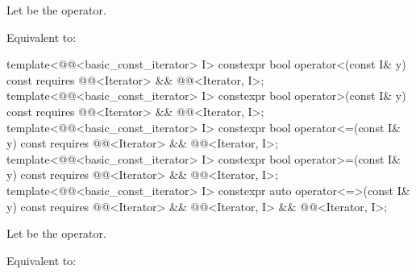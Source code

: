 \begin{itemdescr}
\pnum
Let  be the operator.

\pnum
\effects
Equivalent to:
\end{itemdescr}

%
%
%
%
%
\begin{itemdecl}
template<@@<basic_const_iterator> I>
  constexpr bool operator<(const I& y) const
    requires @@<Iterator> && @@<Iterator, I>;
template<@@<basic_const_iterator> I>
  constexpr bool operator>(const I& y) const
    requires @@<Iterator> && @@<Iterator, I>;
template<@@<basic_const_iterator> I>
  constexpr bool operator<=(const I& y) const
    requires @@<Iterator> && @@<Iterator, I>;
template<@@<basic_const_iterator> I>
  constexpr bool operator>=(const I& y) const
    requires @@<Iterator> && @@<Iterator, I>;
template<@@<basic_const_iterator> I>
  constexpr auto operator<=>(const I& y) const
    requires @@<Iterator> && @@<Iterator, I> &&
             @@<Iterator, I>;
\end{itemdecl}

\begin{itemdescr}
\pnum
Let  be the operator.

\pnum
\effects
Equivalent to: 
\end{itemdescr}


